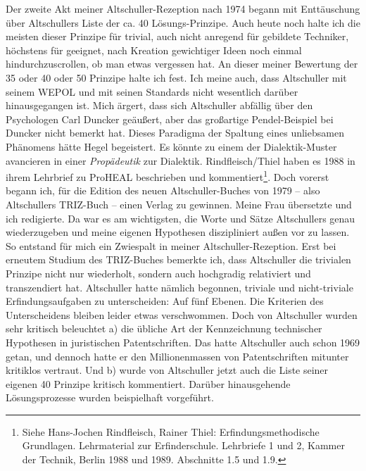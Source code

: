 \documentclass[12pt,a4paper]{article}
\begin{document}
Der zweite Akt meiner Altschuller-Rezeption nach 1974 begann mit Enttäuschung
über Altschullers Liste der ca. 40 Lösungs-Prinzipe. Auch heute noch halte ich
die meisten dieser Prinzipe für trivial, auch nicht anregend für gebildete
Techniker, höchstens für geeignet, nach Kreation gewichtiger Ideen noch einmal
hindurchzuscrollen, ob man etwas vergessen hat. An dieser meiner Bewertung der
35 oder 40 oder 50 Prinzipe halte ich fest. Ich meine auch, dass Altschuller
mit seinem WEPOL und mit seinen Standards nicht wesentlich darüber
hinausgegangen ist. Mich ärgert, dass sich Altschuller abfällig über den
Psychologen Carl Duncker geäußert, aber das großartige Pendel-Beispiel bei
Duncker nicht bemerkt hat. Dieses Paradigma der Spaltung eines unliebsamen
Phänomens hätte Hegel begeistert. Es könnte zu einem der Dialektik-Muster
avancieren in einer \emph{Propädeutik} zur Dialektik. Rindfleisch/Thiel haben
es 1988 in ihrem Lehrbrief zu ProHEAL beschrieben und
kommentiert\footnote{Siehe Hans-Jochen Rindfleisch, Rainer Thiel:
  Erfindungsmethodische Grundlagen.  Lehrmaterial zur
  Erfinderschule. Lehrbriefe 1 und 2, Kammer der Technik, Berlin 1988 und 1989.
  Abschnitte 1.5 und 1.9.}. Doch vorerst begann ich, für die Edition des neuen
Altschuller-Buches von 1979 – also Altschullers TRIZ-Buch – einen Verlag zu
gewinnen. Meine Frau übersetzte und ich redigierte. Da war es am wichtigsten,
die Worte und Sätze Altschullers genau wiederzugeben und meine eigenen
Hypothesen diszipliniert außen vor zu lassen. So entstand für mich ein
Zwiespalt in meiner Altschuller-Rezeption. Erst bei erneutem Studium des
TRIZ-Buches bemerkte ich, dass Altschuller die trivialen Prinzipe nicht nur
wiederholt, sondern auch hochgradig relativiert und transzendiert hat.
Altschuller hatte nämlich begonnen, triviale und nicht-triviale
Erfindungsaufgaben zu unterscheiden: Auf fünf Ebenen. Die Kriterien des
Unterscheidens bleiben leider etwas verschwommen. Doch von Altschuller wurden
sehr kritisch beleuchtet a) die übliche Art der Kennzeichnung technischer
Hypothesen in juristischen Patentschriften. Das hatte Altschuller auch schon
1969 getan, und dennoch hatte er den Millionenmassen von Patentschriften
mitunter kritiklos vertraut. Und b) wurde von Altschuller jetzt auch die Liste
seiner eigenen 40 Prinzipe kritisch kommentiert. Darüber hinausgehende
Lösungsprozesse wurden beispielhaft vorgeführt.
\end{document}

